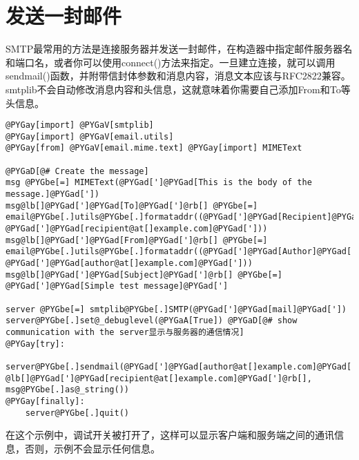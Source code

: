 \documentclass[a4paper,10pt,english]{manual}
\begin{document}
\section{发送一封邮件}

SMTP最常用的方法是连接服务器并发送一封邮件，在构造器中指定邮件服务器名和端口名，或者你可以使用connect()方法来指定。一旦建立连接，就可以调用sendmail()函数，并附带信封体参数和消息内容，消息文本应该与RFC2822兼容。smtplib不会自动修改消息内容和头信息，这就意味着你需要自己添加From和To等头信息。

\begin{Verbatim}[commandchars=@\[\]]
@PYGay[import] @PYGaV[smtplib]
@PYGay[import] @PYGaV[email.utils]
@PYGay[from] @PYGaV[email.mime.text] @PYGay[import] MIMEText

@PYGaD[@# Create the message]
msg @PYGbe[=] MIMEText(@PYGad[']@PYGad[This is the body of the message.]@PYGad['])
msg@lb[]@PYGad[']@PYGad[To]@PYGad[']@rb[] @PYGbe[=] email@PYGbe[.]utils@PYGbe[.]formataddr((@PYGad[']@PYGad[Recipient]@PYGad['], @PYGad[']@PYGad[recipient@at[]example.com]@PYGad[']))
msg@lb[]@PYGad[']@PYGad[From]@PYGad[']@rb[] @PYGbe[=] email@PYGbe[.]utils@PYGbe[.]formataddr((@PYGad[']@PYGad[Author]@PYGad['], @PYGad[']@PYGad[author@at[]example.com]@PYGad[']))
msg@lb[]@PYGad[']@PYGad[Subject]@PYGad[']@rb[] @PYGbe[=] @PYGad[']@PYGad[Simple test message]@PYGad[']

server @PYGbe[=] smtplib@PYGbe[.]SMTP(@PYGad[']@PYGad[mail]@PYGad['])
server@PYGbe[.]set@_debuglevel(@PYGaA[True]) @PYGaD[@# show communication with the server显示与服务器的通信情况]
@PYGay[try]:
    server@PYGbe[.]sendmail(@PYGad[']@PYGad[author@at[]example.com]@PYGad['], @lb[]@PYGad[']@PYGad[recipient@at[]example.com]@PYGad[']@rb[], msg@PYGbe[.]as@_string())
@PYGay[finally]:
    server@PYGbe[.]quit()
\end{Verbatim}

在这个示例中，调试开关被打开了，这样可以显示客户端和服务端之间的通讯信息，否则，示例不会显示任何信息。
\end{document}
